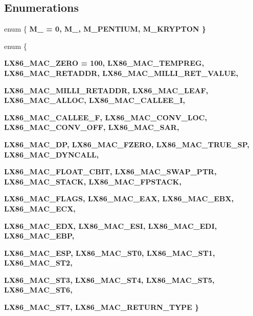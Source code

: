 \subsection*{Enumerations}
\begin{CompactItemize}
\item 
enum \{ \bf{M\_} =  0, 
\bf{M\_}, 
\bf{M\_\-PENTIUM}, 
\bf{M\_\-KRYPTON}
 \}
\item 
enum \{ \par
\bf{LX86\_\-MAC\_\-ZERO} =  100, 
\bf{LX86\_\-MAC\_\-TEMPREG}, 
\bf{LX86\_\-MAC\_\-RETADDR}, 
\bf{LX86\_\-MAC\_\-MILLI\_\-RET\_\-VALUE}, 
\par
\bf{LX86\_\-MAC\_\-MILLI\_\-RETADDR}, 
\bf{LX86\_\-MAC\_\-LEAF}, 
\bf{LX86\_\-MAC\_\-ALLOC}, 
\bf{LX86\_\-MAC\_\-CALLEE\_\-I}, 
\par
\bf{LX86\_\-MAC\_\-CALLEE\_\-F}, 
\bf{LX86\_\-MAC\_\-CONV\_\-LOC}, 
\bf{LX86\_\-MAC\_\-CONV\_\-OFF}, 
\bf{LX86\_\-MAC\_\-SAR}, 
\par
\bf{LX86\_\-MAC\_\-DP}, 
\bf{LX86\_\-MAC\_\-FZERO}, 
\bf{LX86\_\-MAC\_\-TRUE\_\-SP}, 
\bf{LX86\_\-MAC\_\-DYNCALL}, 
\par
\bf{LX86\_\-MAC\_\-FLOAT\_\-CBIT}, 
\bf{LX86\_\-MAC\_\-SWAP\_\-PTR}, 
\bf{LX86\_\-MAC\_\-STACK}, 
\bf{LX86\_\-MAC\_\-FPSTACK}, 
\par
\bf{LX86\_\-MAC\_\-FLAGS}, 
\bf{LX86\_\-MAC\_\-EAX}, 
\bf{LX86\_\-MAC\_\-EBX}, 
\bf{LX86\_\-MAC\_\-ECX}, 
\par
\bf{LX86\_\-MAC\_\-EDX}, 
\bf{LX86\_\-MAC\_\-ESI}, 
\bf{LX86\_\-MAC\_\-EDI}, 
\bf{LX86\_\-MAC\_\-EBP}, 
\par
\bf{LX86\_\-MAC\_\-ESP}, 
\bf{LX86\_\-MAC\_\-ST0}, 
\bf{LX86\_\-MAC\_\-ST1}, 
\bf{LX86\_\-MAC\_\-ST2}, 
\par
\bf{LX86\_\-MAC\_\-ST3}, 
\bf{LX86\_\-MAC\_\-ST4}, 
\bf{LX86\_\-MAC\_\-ST5}, 
\bf{LX86\_\-MAC\_\-ST6}, 
\par
\bf{LX86\_\-MAC\_\-ST7}, 
\bf{LX86\_\-MAC\_\-RETURN\_\-TYPE}
 \}
\end{CompactItemize}
